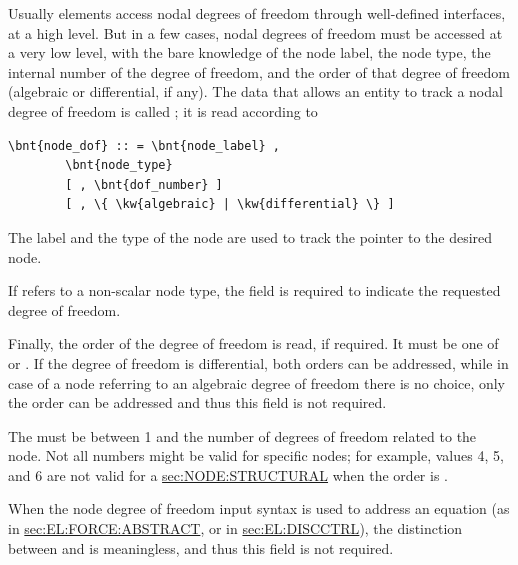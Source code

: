 Usually elements access nodal degrees of freedom through well-defined
interfaces, at a high level. 
But in a few cases, nodal degrees of freedom must be accessed
at a very low level, with the bare knowledge of the node label,
the node type, the internal number of the degree of freedom,
and the order of that degree of freedom (algebraic or differential, if any).
The data that allows an entity to track a nodal degree of freedom
is called ; it is read according to
\begin{Verbatim}[commandchars=\\\{\}]
    \bnt{node_dof} :: = \bnt{node_label} , 
        \bnt{node_type}
        [ , \bnt{dof_number} ]
        [ , \{ \kw{algebraic} | \kw{differential} \} ]
\end{Verbatim}
The label  and the type 
of the node are used to track the pointer to the desired node. 

If  refers to a non-scalar node type,
the  field is required to indicate the requested
degree of freedom.

Finally, the order of the degree of freedom is read, if required.
It must be one of  or .
If the  degree of freedom is differential, both
orders can be addressed, while in case of a node referring
to an algebraic degree of freedom there is no choice,
only the  order can be addressed and thus this field
is not required.

The  must be between 1 and the number of degrees of freedom
related to the node.
Not all numbers might be valid for specific nodes; for example,
 values 4, 5, and 6 are not valid for a
\hyperref{\kw{structural node}}{\kw{structural node}, Section~}{}{sec:NODE:STRUCTURAL} when the order is .

When the node degree of freedom input syntax is used to address
an equation (as in
\hyperref{\kw{abstract} force elements}{\kw{abstract} force elements, Section~}{}{sec:EL:FORCE:ABSTRACT},
or in
\hyperref{\kw{discrete control} elements}{\kw{discrete control} elements, Section~}{}{sec:EL:DISCCTRL}),
the distinction between  and  is meaningless,
and thus this field is not required.




